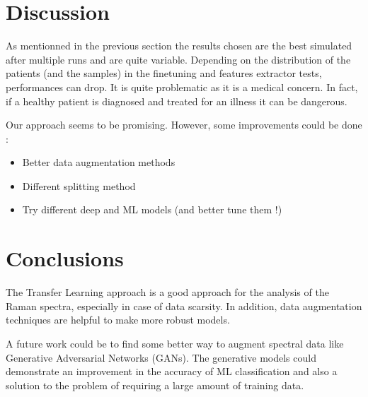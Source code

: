 \section{Discussion}
As mentionned in the previous section the results chosen are the best simulated after multiple runs and are quite variable. Depending on the distribution of the patients (and the samples) in the finetuning and features extractor tests, performances can drop.
It is quite problematic as it is a medical concern. 
In fact, if a healthy patient is diagnosed and treated for an illness it can be dangerous.

Our approach seems to be promising. However, some improvements could be done :
\begin{itemize}
\item Better data augmentation methods
\item Different splitting method
\item Try different deep and ML models (and better tune them !)
\end{itemize}

\section{Conclusions}
The Transfer Learning approach is a good approach for the analysis of the Raman spectra, especially in case of data scarsity. In addition, data augmentation techniques are helpful to make more robust models. 

A future work could be to find some better way to augment spectral data like Generative Adversarial Networks (GANs). The generative models could demonstrate an improvement in the accuracy of ML classification and also a solution to the problem of requiring a large amount of training data.

